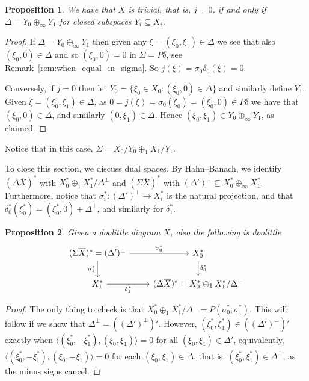 \documentclass[a4paper,11pt]{article}
\theoremstyle{plain}
\newtheorem{proposition}{Proposition}[section]
\theoremstyle{remark}
\newcommand{\ip}[2]{{\langle {#1} , {#2} \rangle}}
\begin{document}
\begin{proposition}\label{prop:when_j_zero}
We have that $\overline X$ is trivial, that is, $j=0$, if and only if $\Delta = Y_0 \oplus_\infty Y_1$ for closed subspaces $Y_i \subseteq X_i$.
\end{proposition}
\begin{proof}
If $\Delta = Y_0 \oplus_\infty Y_1$ then given any $\xi=(\xi_0,\xi_1)\in \Delta$ we see that also $(\xi_0,0) \in \Delta$ and so $(\xi_0,0) = 0$ in $\Sigma = P\delta$, see Remark~\ref{rem:when_equal_in_sigma}.  So $j(\xi) = \sigma_0 \delta_0(\xi)=0$.

Conversely, if $j=0$ then let $Y_0 = \{ \xi_0\in X_0 : (\xi_0,0)\in \Delta \}$ and similarly define $Y_1$.  Given $\xi=(\xi_0,\xi_1)\in \Delta$, as $0 = j(\xi) = \sigma_0(\xi_0) = (\xi_0,0) \in P\delta$ we have that $(\xi_0,0) \in \Delta$, and similarly $(0,\xi_1)\in\Delta$.  Hence $(\xi_0,\xi_1) \in Y_0 \oplus_\infty Y_1$, as claimed.
\end{proof}

Notice that in this case, $\Sigma = X_0/Y_0 \oplus_1 X_1/Y_1$.

To close this section, we discuss dual spaces.  By Hahn--Banach, we identify $(\Delta\overline X)^*$ with $X_0^* \oplus_1 X_1^* / \Delta^\perp$ and $(\Sigma\overline X)^*$ with $(\Delta')^\perp \subseteq X_0^* \oplus_\infty X_1^*$.  Furthermore, notice that $\sigma_i^* \colon (\Delta')^\perp \to X_i^*$ is the natural projection, and that $\delta_0^*(\xi_0^*) = (\xi_0^*,0) + \Delta^\perp$, and similarly for $\delta_1^*$.

\begin{proposition}\label{prop:dual}
Given a doolittle diagram $\overline X$, also the following is doolittle
\[ \begin{tikzcd}
(\Sigma\overline X)^* = (\Delta')^\perp  \arrow[r, "\sigma_0^*"] \arrow[d, "\sigma_1^*"'] & X_0^* \arrow[d, "\delta_0^*"]\\
X_1^* \arrow[r, "\delta_1^*"'] & (\Delta\overline X)^* = X_0^* \oplus_1 X_1^* / \Delta^\perp
\end{tikzcd} \]
\end{proposition}
\begin{proof}
The only thing to check is that $X_0^* \oplus_1 X_1^* / \Delta^\perp = P(\sigma_0^*, \sigma_1^*)$.  This will follow if we show that $\Delta^\perp = ((\Delta')^\perp)'$.  However, $(\xi_0^*, \xi_1^*) \in ((\Delta')^\perp)'$ exactly when $\ip{(\xi_0^*, -\xi_1^*)}{(\xi_0,\xi_1)}=0$ for all $(\xi_0,\xi_1) \in \Delta'$, equivalently, $\ip{(\xi_0^*, -\xi_1^*)}{(\xi_0,-\xi_1)}=0$ for each $(\xi_0,\xi_1)\in \Delta$, that is, $(\xi_0^*, \xi_1^*) \in \Delta^\perp$, as the minus signs cancel.
\end{proof}
\end{document}
